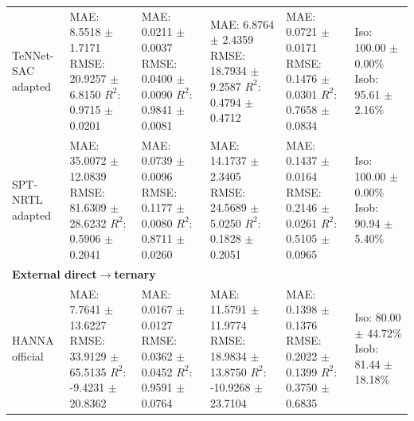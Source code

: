 \begin{tabular}{llllll}
TeNNet-SAC adapted & \shortstack[l]{MAE: 8.5518 $\pm$ 1.7171 \\ RMSE: 20.9257 $\pm$ 6.8150 \\ $R^2$: 0.9715 $\pm$ 0.0201} & \shortstack[l]{MAE: 0.0211 $\pm$ 0.0037 \\ RMSE: 0.0400 $\pm$ 0.0090 \\ $R^2$: 0.9841 $\pm$ 0.0081} & \shortstack[l]{MAE: 6.8764 $\pm$ 2.4359 \\ RMSE: 18.7934 $\pm$ 9.2587 \\ $R^2$: 0.4794 $\pm$ 0.4712} & \shortstack[l]{MAE: 0.0721 $\pm$ 0.0171 \\ RMSE: 0.1476 $\pm$ 0.0301 \\ $R^2$: 0.7658 $\pm$ 0.0834} & \shortstack[l]{Iso: 100.00 $\pm$ 0.00\% \\ Isob: 95.61 $\pm$ 2.16\%} \\
SPT-NRTL adapted & \shortstack[l]{MAE: 35.0072 $\pm$ 12.0839 \\ RMSE: 81.6309 $\pm$ 28.6232 \\ $R^2$: 0.5906 $\pm$ 0.2041} & \shortstack[l]{MAE: 0.0739 $\pm$ 0.0096 \\ RMSE: 0.1177 $\pm$ 0.0080 \\ $R^2$: 0.8711 $\pm$ 0.0260} & \shortstack[l]{MAE: 14.1737 $\pm$ 2.3405 \\ RMSE: 24.5689 $\pm$ 5.0250 \\ $R^2$: 0.1828 $\pm$ 0.2051} & \shortstack[l]{MAE: 0.1437 $\pm$ 0.0164 \\ RMSE: 0.2146 $\pm$ 0.0261 \\ $R^2$: 0.5105 $\pm$ 0.0965} & \shortstack[l]{Iso: 100.00 $\pm$ 0.00\% \\ Isob: 90.94 $\pm$ 5.40\%} \\
\hline
\multicolumn{6}{l}{\textbf{External direct$\to$ternary}} \\
HANNA official & \shortstack[l]{MAE: 7.7641 $\pm$ 13.6227 \\ RMSE: 33.9129 $\pm$ 65.5135 \\ $R^2$: -9.4231 $\pm$ 20.8362} & \shortstack[l]{MAE: 0.0167 $\pm$ 0.0127 \\ RMSE: 0.0362 $\pm$ 0.0452 \\ $R^2$: 0.9591 $\pm$ 0.0764} & \shortstack[l]{MAE: 11.5791 $\pm$ 11.9774 \\ RMSE: 18.9834 $\pm$ 13.8750 \\ $R^2$: -10.9268 $\pm$ 23.7104} & \shortstack[l]{MAE: 0.1398 $\pm$ 0.1376 \\ RMSE: 0.2022 $\pm$ 0.1399 \\ $R^2$: 0.3750 $\pm$ 0.6835} & \shortstack[l]{Iso: 80.00 $\pm$ 44.72\% \\ Isob: 81.44 $\pm$ 18.18\%} \\

\end{tabular}
